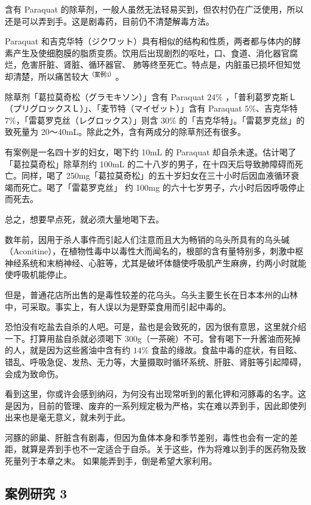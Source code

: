 \documentclass[UTF8]{ctexart}
\begin{document}
含有 Paraquat 的除草剂，一般人虽然无法轻易买到，但农村仍在广泛使用，所以还是可以弄到手。这是剧毒药，目前仍不清楚解毒方法。

Paraquat 和吉克华特（ジクワット）具有相似的结构和性质，两者都与体内的酵素产生及使细胞膜的脂质变质。饮用后出现剧烈的呕吐，口、食道、消化器官腐烂，危害肝脏、肾脏、循环器官、 肺等终至死亡。特点是，内脏虽已损坏但知觉却清楚，所以痛苦较大$^{（案例 3）}$。

除草剂「葛拉莫奇松（グラモキソン）」含有 Paraquat $24\%$ ，「普利葛罗克斯Ｌ（プリグロックスＬ）」、「麦节特（マイゼット）」含有 Paraquat $5\%$、吉克华特 $7\%$，「雷葛罗克丝（レグロックス）」则含 $30\%$ 的「吉克华特」。「雷葛罗克丝」的致死量为 20～40mL。除此之外，含有两成分的除草剂还有很多。

有案例是一名四十岁的妇女，喝下约 10mL 的 Paraquat 却自杀未遂。估计喝了「葛拉莫奇松」除草剂约 100mL 的二十八岁的男子，在十四天后导致肺障碍而死亡。同样，喝了 250mg「葛拉莫奇松」的五十岁妇女在三十小时后因血液循环衰竭而死亡。喝了「雷葛罗克丝」 约 100mg 的六十七岁男子，六小时后因呼吸停止而死去。

总之，想要早点死，就必须大量地喝下去。

数年前，因用于杀人事件而引起人们注意而且大为畅销的乌头所具有的乌头碱（Aconitine），在植物性毒中以毒性大而闻名的，根部的含有量特别多，刺激中枢神经系统和末梢神经、心脏等，尤其是破坏体髓使呼吸肌产生麻痹，约两小时就能使呼吸机能停止。

但是，普通花店所出售的是毒性较差的花乌头。乌头主要生长在日本本州的山林中，可采取。事实上，有人误以为是野菜食用而引起中毒的。

恐怕没有吃盐去自杀的人吧。可是，盐也是会致死的，因为很有意思，这里就介绍一下。打算用盐自杀就必须喝下 300g（一茶碗）不可。曾有喝下一升酱油而死掉的人，就是因为这些酱油中含有约 $14\%$ 食盐的缘故。食盐中毒的症状，有目眩、错乱、呼吸急促、发热、无力等，大量摄取时循环系统、肝脏、肾脏等引起障碍，会成为致命伤。

看到这里，你或许会感到纳闷，为何没有出现常听到的氰化钾和河豚毒的名字。这是因为，目前的管理、废弃的一系列规定极为严格，实在难以弄到手，因此即使列出来也是毫无意义，就未列于此。

河豚的卵巢、肝脏含有剧毒，但因为鱼体本身和季节差别，毒性也会有一定的差距，就算是弄到手也不一定适合于自杀。关于这些，作为将难以到手的医药物及致死量列于本章之末。 如果能弄到手，倒是希望大家利用。

\subsection{案例研究 3}
\end{document}
